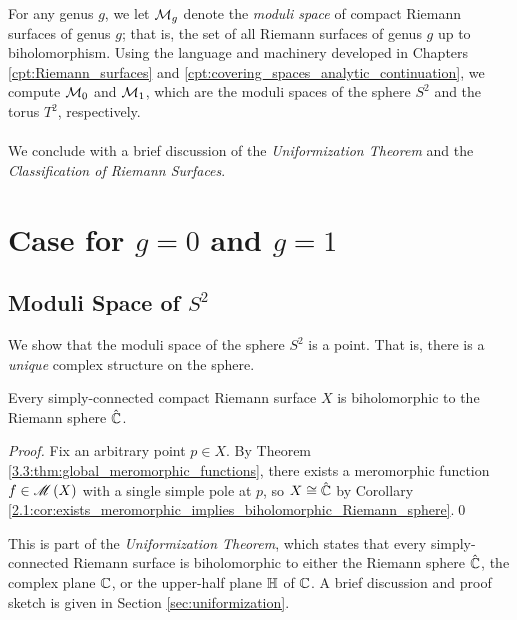 \documentclass[../Moduli_Spaces_of_Riemann_Surfaces.tex]{subfiles}
\begin{document}
    For any genus $g$, we let $\mathcal{M}_g$ denote the \textit{moduli space} of compact Riemann surfaces of genus $g$; that is, the set of all Riemann surfaces of genus $g$ up to biholomorphism. Using the language and machinery developed in Chapters \ref{cpt:Riemann_surfaces} and \ref{cpt:covering_spaces_analytic_continuation}, we compute $\mathcal{M}_0$ and $\mathcal{M}_1$, which are the moduli spaces of the sphere $S^2$ and the torus $T^2$, respectively.\\\ \\
    We conclude with a brief discussion of the \textit{Uniformization Theorem} and the \textit{Classification of Riemann Surfaces}.
    \section{Case for $g=0$ and $g=1$}
    \subsection{Moduli Space of $S^2$}\label{sec:moduli_space_of_sphere}
    We show that the moduli space of the sphere $S^2$ is a point. That is, there is a \textit{unique} complex structure on the sphere.
    \begin{theorem}\label{4.1:thm:simply-connect_compact_biholomorphic_Riemann_sphere}
        Every simply-connected compact Riemann surface $X$ is biholomorphic to the Riemann sphere $\hat{\mathbb{C}}$.
    \end{theorem}
    \begin{proof}
        Fix an arbitrary point $p\in X$. By Theorem \ref{3.3:thm:global_meromorphic_functions}, there exists a meromorphic function $f\in\mathscr{M}\left(X\right)$ with a single simple pole at $p$, so $X\cong\hat{\mathbb{C}}$ by Corollary \ref{2.1:cor:exists_meromorphic_implies_biholomorphic_Riemann_sphere}.\qed
    \end{proof}
    \begin{remark}
        This is part of the \textit{Uniformization Theorem}, which states that every simply-connected Riemann surface is biholomorphic to either the Riemann sphere $\hat{\mathbb{C}}$, the complex plane $\mathbb{C}$, or the upper-half plane $\mathbb{H}$ of $\mathbb{C}$. A brief discussion and proof sketch is given in Section \ref{sec:uniformization}.\exqed
    \end{remark}
\end{document}

